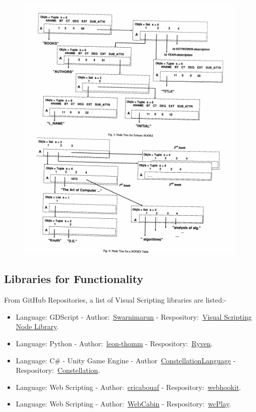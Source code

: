 \documentclass[12pt]{report} %
\begin{document}
			\begin{figure}[H]
				{\includegraphics[scale=0.6]{Figures/VPDBEDIT.png}}
			\end{figure}

		\subsection{Libraries for Functionality}
			From GitHub Repositories, a list of Visual Scripting libraries are listed:-
			\begin{itemize}
			\item Language: GDScript - Author:~\href{https://github.com/swarnimarun}{Swarnimarun} - Respository:~\href{https://github.com/swarnimarun/visual-scripting-node-library}{Visual Scripting Node Library}.
			\item Language: Python - Author:~\href{https://github.com/leon-thomm}{leon-thomm} - Respository:~\href{https://github.com/leon-thomm/Ryven}{Ryven}.
			\item Language: C\# - Unity Game Engine - Author~\href{https://github.com/ConstellationLanguage}{ConstellationLanguage} - Respository:~\href{https://github.com/ConstellationLanguage/Constellation}{Constellation}.
			\item Language: Web Scripting - Author:~\href{https://github.com/ericabouaf}{ericabouaf} - Respository:~\href{https://github.com/ericabouaf/webhookit}{webhookit}.
			\item Language: Web Scripting - Author:~\href{https://github.com/WebCabin}{WebCabin} - Respository:~\href{https://github.com/WebCabin/wcPlay}{wcPlay}.
			\end{itemize}
\end{document}
